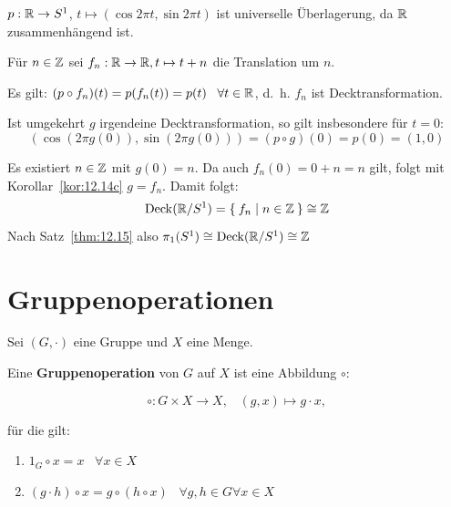 \begin{beispiel}
    $p: \mathbb{R} \rightarrow S^1$, $t \mapsto (\cos 2 \pi t, \sin 2 \pi t)$
    ist universelle Überlagerung, da $\mathbb{R}$ zusammenhängend ist.

    Für $n \in \mathbb{Z}$ sei $f_n: \mathbb{R} \rightarrow \mathbb{R}, t \mapsto t + n$
    die Translation um $n$.

    Es gilt: $(p \circ f_n)(t) = p(f_n(t)) = p(t) \;\;\; \forall t \in \mathbb{R}$,
    d.~h. $f_n$ ist Decktransformation.

    Ist umgekehrt $g$ irgendeine Decktransformation, so gilt insbesondere
    für $t=0$:
    \[(\cos(2 \pi g(0)), \sin(2 \pi g(0))) = (p \circ g)(0) = p(0) = (1,0)\]

    Es existiert $n \in \mathbb{Z}$ mit $g(0) = n$. Da auch $f_n(0) = 0 + n = n$
    gilt, folgt mit Korollar~\ref{kor:12.14c} $g = f_n$. Damit folgt:
    \[\operatorname{Deck}(\mathbb{R}/S^1) = \Set{f_n | n \in \ensuremath{\mathbb{Z}}} \cong \mathbb{Z}\]
    Nach Satz~\ref{thm:12.15} also $\pi_1(S^1) \cong \operatorname{Deck}(\mathbb{R}/S^1) \cong \mathbb{Z}$
\end{beispiel}

\section{Gruppenoperationen}
\begin{definition}%
    Sei $(G, \cdot)$ eine Gruppe und $X$ eine Menge.

    Eine \textbf{Gruppenoperation} von $G$ auf
    $X$ ist eine Abbildung $\circ$:
    
    \[ \circ: G \times X \rightarrow X,\;\;\; (g,x) \mapsto g \cdot x,\]

    für die gilt:
    \begin{enumerate}[label=(\roman*),ref=\theplaindefinition.\roman*]
        \item $1_G \circ x = x \;\;\; \forall x \in X$\label{def:gruppenoperation.1}
        \item $(g \cdot h) \circ x = g \circ (h \circ x) \;\;\; \forall g,h \in G \forall x \in X$\label{def:gruppenoperation.2}
    \end{enumerate}
\end{definition}

